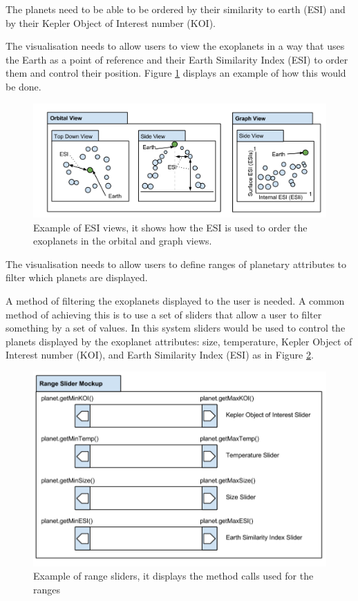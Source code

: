 \begin{enumerate}
{\bf
 \item[R3.] The planets need to be able to be ordered by their similarity to
earth (ESI) and by their Kepler Object of Interest number (KOI).}

The visualisation needs to allow users to view the
exoplanets in a way that uses the Earth as a point of reference and their Earth
Similarity Index (ESI) to order them and control their position. Figure
\ref{fig:esiMock} displays an example of how this would be done.

\begin{figure}[H]
  \centering
      \includegraphics[width=1\textwidth]{images/mockupESI.png}
  \caption[Example of ESI views]{Example of ESI views, it shows how the ESI is
used to order the exoplanets in the orbital and graph views.}
  \label{fig:esiMock}
\end{figure}

\clearpage
{\bf
 \item[R4.] The visualisation needs to allow users to define ranges of planetary
attributes to filter which planets are displayed.}

A method of filtering the exoplanets displayed to the user is needed. A
common method of achieving this is to use a set of sliders that allow a user to
filter something by a set of values. In this system sliders would
be used to control the planets displayed by the exoplanet attributes: size,
temperature, Kepler Object of Interest number (KOI), and Earth Similarity Index
(ESI) as in Figure \ref{fig:mockSlider}.
\begin{figure}[H]
  \centering
      \includegraphics[width=.8\textwidth]{images/mockSlider.png}
  \caption[Example of range sliders]{Example of range sliders, it displays the
method calls used for the ranges}  
  \label{fig:mockSlider}
\end{figure}


\end{enumerate}

